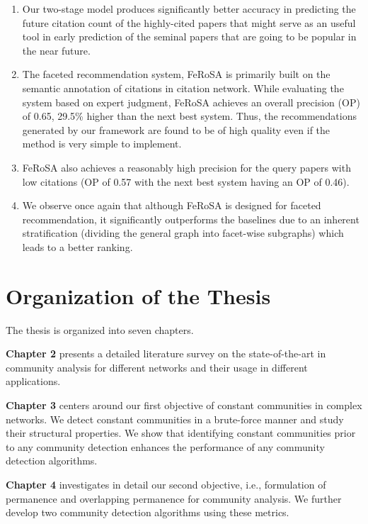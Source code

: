 \begin{enumerate}
\item Our two-stage model produces significantly better accuracy in predicting the future citation count of the highly-cited
papers that might serve as an useful tool in early prediction of the seminal papers that are going to be popular in the near future.

\item The faceted recommendation system, FeRoSA is primarily built on the semantic annotation of citations in citation network. While
evaluating the system based on expert judgment, FeRoSA achieves an overall precision (OP) of 0.65, 29.5\% higher than the
next best
system. Thus, the recommendations generated by our framework are found to be of high quality even if the method is very simple to
implement. 

\item FeRoSA also achieves a reasonably high precision for the query papers with low citations (OP of 0.57 with the next
best system having an OP of 0.46).

\item We observe once again that although FeRoSA is designed for faceted recommendation, it significantly outperforms the baselines due to
an inherent stratification (dividing the general graph into facet-wise subgraphs) which leads to a better ranking. 

\end{enumerate}


\section{Organization of the Thesis}
The thesis is organized into seven chapters.

{\bf Chapter 2} presents a detailed literature survey on the state-of-the-art in community analysis for different networks
and their usage in different applications. 

{\bf Chapter 3} centers around our first objective of constant communities in complex networks. We detect constant communities in a
brute-force manner and study their structural properties. We show that identifying constant communities prior to any community detection
enhances the performance of any community detection algorithms.

{\bf Chapter 4} investigates in detail our second objective, i.e., formulation of permanence and overlapping permanence for community
analysis. We further develop two community detection algorithms using these metrics.

